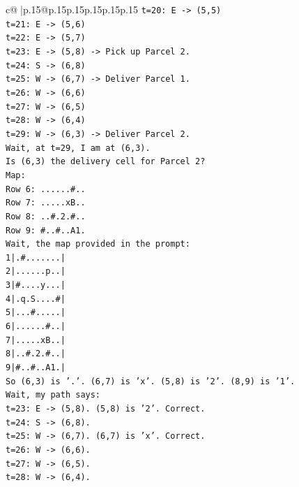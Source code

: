 \documentclass{article}
\begin{document}
{\begin{supertabular}{c@{$\;$}|p{.15\linewidth}@{}p{.15\linewidth}p{.15\linewidth}p{.15\linewidth}p{.15\linewidth}p{.15\linewidth}}
{{{\texttt{t=20: E {-}> (5,5)} \\
\texttt{t=21: E {-}> (5,6)} \\
\texttt{t=22: E {-}> (5,7)} \\
\texttt{t=23: E {-}> (5,8) {-}> Pick up Parcel 2.} \\
\texttt{t=24: S {-}> (6,8)} \\
\texttt{t=25: W {-}> (6,7) {-}> Deliver Parcel 1.} \\
\texttt{t=26: W {-}> (6,6)} \\
\texttt{t=27: W {-}> (6,5)} \\
\texttt{t=28: W {-}> (6,4)} \\
\texttt{t=29: W {-}> (6,3) {-}> Deliver Parcel 2.} \\
\texttt{Wait, at t=29, I am at (6,3).} \\
\texttt{Is (6,3) the delivery cell for Parcel 2?} \\
\texttt{Map:} \\
\texttt{Row 6: ......\#..} \\
\texttt{Row 7: .....xB..} \\
\texttt{Row 8: ..\#.2.\#..} \\
\texttt{Row 9: \#..\#..A1.} \\
\texttt{Wait, the map provided in the prompt:} \\
\texttt{1|.\#.......|} \\
\texttt{2|......p..|} \\
\texttt{3|\#....y...|} \\
\texttt{4|.q.S....\#|} \\
\texttt{5|...\#.....|} \\
\texttt{6|......\#..|} \\
\texttt{7|.....xB..|} \\
\texttt{8|..\#.2.\#..|} \\
\texttt{9|\#..\#..A1.|} \\
\texttt{So (6,3) is '.'. (6,7) is 'x'. (5,8) is '2'. (8,9) is '1'.} \\
\texttt{Wait, my path says:} \\
\texttt{t=23: E {-}> (5,8). (5,8) is '2'. Correct.} \\
\texttt{t=24: S {-}> (6,8).} \\
\texttt{t=25: W {-}> (6,7). (6,7) is 'x'. Correct.} \\
\texttt{t=26: W {-}> (6,6).} \\
\texttt{t=27: W {-}> (6,5).} \\
\texttt{t=28: W {-}> (6,4).} \\
}}}
\end{supertabular}}
\end{document}
